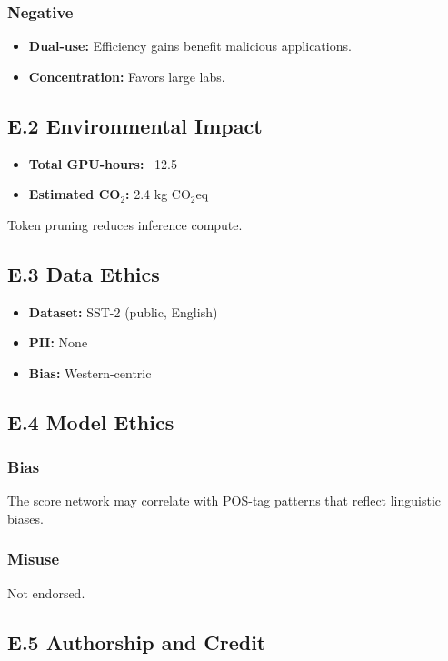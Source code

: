 \subsubsection{Negative}
\begin{itemize}
\item \textbf{Dual-use:} Efficiency gains benefit malicious applications.
\item \textbf{Concentration:} Favors large labs.

\end{itemize}
\subsection{E.2 Environmental Impact}

\begin{itemize}
\item \textbf{Total GPU-hours:} ~12.5
\item \textbf{Estimated CO$_2$:} 2.4 kg CO$_2$eq

\end{itemize}
Token pruning reduces inference compute.

\subsection{E.3 Data Ethics}

\begin{itemize}
\item \textbf{Dataset:} SST-2 (public, English)
\item \textbf{PII:} None
\item \textbf{Bias:} Western-centric

\end{itemize}
\subsection{E.4 Model Ethics}

\subsubsection{Bias}
The score network may correlate with POS-tag patterns that reflect 
linguistic biases.

\subsubsection{Misuse}
Not endorsed.

\subsection{E.5 Authorship and Credit}

